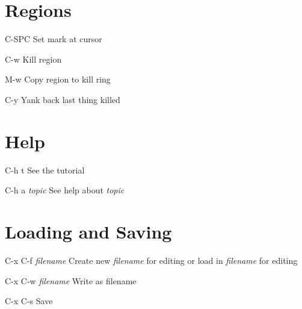 \documentclass[11pt,a4paper]{article}
\begin{document}
\begin{multicols}{2}
\section{Regions}
\begin{eqlist}
\item[C-SPC] Set mark at cursor
\item[C-w] Kill region
\item[M-w] Copy region to kill ring
\item[C-y] Yank back last thing killed

\end{eqlist}

\section{Help}
\begin{eqlist}
\item[C-h t] See the tutorial
\item[C-h a \textit{topic}] See help about \textit{topic}
\end{eqlist}

\section{Loading and Saving}
\begin{eqlist}
\item[C-x C-f \textit{filename}] Create new \textit{filename} for
  editing or load in \textit{filename} for editing
\item[C-x C-w \textit{filename}] Write as filename
\item[C-x C-s] Save 
\end{eqlist}

\end{multicols}
\end{document}
